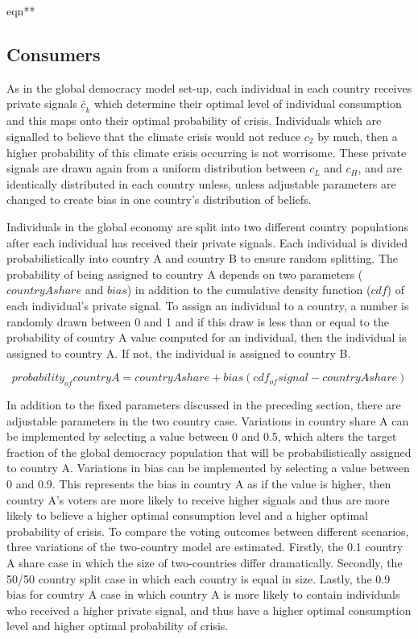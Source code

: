 \documentclass[11pt,preprint, authoryear]{elsarticle}
\numberwithin{equation}{section}
\numberwithin{figure}{section}
\numberwithin{table}{section}
\begin{document}
eqn**

\hypertarget{consumers}{%
\subsection*{Consumers}\label{consumers}}

As in the global democracy model set-up, each individual in each country
receives private signals \(\hat{\underline{c}}_k\) which determine their
optimal level of individual consumption and this maps onto their optimal
probability of crisis. Individuals which are signalled to believe that
the climate crisis would not reduce \(c_2\) by much, then a higher
probability of this climate crisis occurring is not worrisome. These
private signals are drawn again from a uniform distribution between
\(c_L\) and \(c_H\), and are identically distributed in each country
unless, unless adjustable parameters are changed to create bias in one
country's distribution of beliefs.

Individuals in the global economy are split into two different country
populations after each individual has received their private signals.
Each individual is divided probabilistically into country A and country
B to ensure random splitting. The probability of being assigned to
country A depends on two parameters (\(countryAshare\) and \(bias\)) in
addition to the cumulative density function (\(cdf\)) of each
individual's private signal. To assign an individual to a country, a
number is randomly drawn between 0 and 1 and if this draw is less than
or equal to the probability of country A value computed for an
individual, then the individual is assigned to country A. If not, the
individual is assigned to country B.

\[probability_{of}country A = country A share + bias(cdf_{of}signal - country A share)\]

In addition to the fixed parameters discussed in the preceding section,
there are adjustable parameters in the two country case. Variations in
country share A can be implemented by selecting a value between 0 and
0.5, which alters the target fraction of the global democracy population
that will be probabilistically assigned to country A. Variations in bias
can be implemented by selecting a value between 0 and 0.9. This
represents the bias in country A as if the value is higher, then country
A's voters are more likely to receive higher signals and thus are more
likely to believe a higher optimal consumption level and a higher
optimal probability of crisis. To compare the voting outcomes between
different scenarios, three variations of the two-country model are
estimated. Firstly, the 0.1 country A share case in which the size of
two-countries differ dramatically. Secondly, the 50/50 country split
case in which each country is equal in size. Lastly, the 0.9 bias for
country A case in which country A is more likely to contain individuals
who received a higher private signal, and thus have a higher optimal
consumption level and higher optimal probability of crisis.
\end{document}
